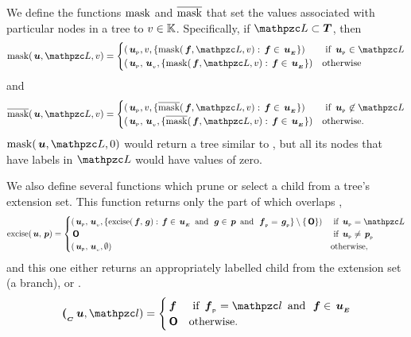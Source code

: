 \begin{definition}\label{mask}
  We define the functions $\operatorname{mask}$ and $\operatorname{\overline{mask}}$ that set the values
  associated with particular nodes in a tree to $v\in\mathbb{K}$.  Specifically,
  if $\mc{L} \subset \SDOM$, then
  \begin{equation}
    \mask(\node{u},\mc{L},v) = \begin{cases}
     (\nlabel{u}, v, \{\mask(\node{f},\mc{L},v):  \node{f}\in\extn{u}\}) & \text{ if } \nlabel{u} \in \mc{L} \\
      (\nlabel{u}, \nv{u}, \{\mask(\node{f},\mc{L},v): \node{f}\in\extn{u}\}) & \text{otherwise}
    \end{cases}
  \end{equation}
  and
  \begin{equation}
    \nmask(\node{u},\mc{L},v) = \begin{cases}
     (\nlabel{u}, v, \{\nmask(\node{f},\mc{L},v):  \node{f}\in\extn{u}\}) & \text{ if } \nlabel{u} \not\in \mc{L} \\
     (\nlabel{u}, \nv{u}, \{\nmask(\node{f},\mc{L},v): \node{f}\in\extn{u}\}) & \text{otherwise.}
    \end{cases}
  \end{equation}
  $\mask(\node{u},\mc{L},0)$ would return a tree similar to ,
  but all its nodes that have labels in $\mc{L}$ would have values of zero.

  We also define several functions which prune or select a child from
  a tree's extension set. This function returns only the part of
   which overlaps ,
  \begin{equation}
    \excise(\node{u},\node{p}) = \begin{cases}
      (\nlabel{u}, \nv{u}, \{\excise(\node{f},\node{g}): \node{f}\in\extn{u} \mand \node{g}\in\node{p} \mand \nlabel{f} = \nlabel{g}\} \setminus \{\nulltree\}) & \text{ if } \nlabel{u} = \mc{L} \\
      \nulltree & \text{ if }  \nlabel{u} \neq \nlabel{p} \\
      (\nlabel{u}, \nv{u}, \emptyset) & \text{otherwise,}
    \end{cases}
  \end{equation}
  and this one either returns an appropriately labelled child from the extension set (a
  branch), or \tnulltree.
  \begin{equation}
    \child(\node{u}, \mc{l}) = \begin{cases}
      \node{f} & \text{ if } \nlabel{f} = \mc{l} \mand \node{f} \in  \extn{u} \\
      \nulltree & \text{otherwise.}
    \end{cases}
  \end{equation}


\end{definition}
